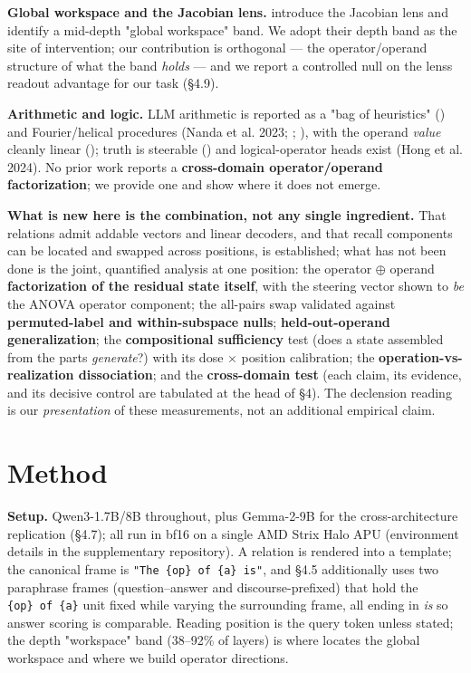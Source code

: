 \textbf{Global workspace and the Jacobian lens.} \citet{gurnee2026workspace} introduce the Jacobian lens and identify a
mid-depth "global workspace" band. We adopt their depth band as the site
of intervention; our contribution is orthogonal --- the operator/operand
structure of what the band \emph{holds} --- and we report a controlled
null on the lens\textquotesingle s readout advantage for our task
(\S{}4.9).

\textbf{Arithmetic and logic.} LLM arithmetic is reported as a "bag of
heuristics" (\citealp{nikankin2025heuristics}) and Fourier/helical procedures (Nanda
et al. 2023; \citealp{zhong2023clock}; \citealp{kantamneni2025trig}), with the
operand \emph{value} cleanly linear (\citealp{gurnee2024space}); truth is
steerable (\citealp{marks2023geometry}) and logical-operator heads exist (Hong
et al. 2024). No prior work reports a \textbf{cross-domain
operator/operand factorization}; we provide one and show where it does
not emerge.

\textbf{What is new here is the combination, not any single ingredient.}
That relations admit addable vectors and linear decoders, and that
recall components can be located and swapped across positions, is
established; what has not been done is the joint, quantified analysis at
one position: the operator \ensuremath{\oplus} operand \textbf{factorization of the
residual state itself}, with the steering vector shown to \emph{be} the
ANOVA operator component; the all-pairs swap validated against
\textbf{permuted-label and within-subspace nulls};
\textbf{held-out-operand generalization}; the \textbf{compositional
sufficiency} test (does a state assembled from the parts
\emph{generate}?) with its dose \ensuremath{\times} position calibration; the
\textbf{operation-vs-realization dissociation}; and the
\textbf{cross-domain test} (each claim, its evidence, and its decisive
control are tabulated at the head of \S{}4). The declension reading is our
\emph{presentation} of these measurements, not an additional empirical
claim.

\section{Method}

\textbf{Setup.} Qwen3-1.7B/8B throughout, plus Gemma-2-9B for the
cross-architecture replication (\S{}4.7); all run in bf16 on a single AMD
Strix Halo APU (environment details in the supplementary repository). A
relation is rendered into a template; the canonical frame is
\texttt{"The\ \{op\}\ of\ \{a\}\ is"}, and \S{}4.5 additionally uses two
paraphrase frames (question--answer and discourse-prefixed) that hold
the \texttt{\{op\}\ of\ \{a\}} unit fixed while varying the surrounding
frame, all ending in \emph{is} so answer scoring is comparable. Reading
position is the query token unless stated; the depth "workspace" band
(38--92\% of layers) is where \citet{gurnee2026workspace} locates the global
workspace and where we build operator directions.

